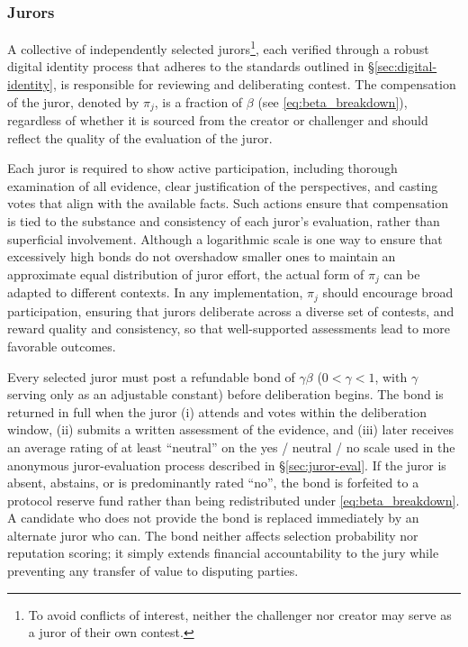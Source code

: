 \documentclass{article}
\begin{document}
\subsubsection{Jurors}

A collective of independently selected jurors\footnote{To avoid conflicts of interest, neither the challenger nor creator may serve as a juror of their own contest.}, each verified through a robust digital identity process that adheres to the standards outlined in \S\ref{sec:digital-identity}, is responsible for reviewing and deliberating contest. The compensation of the juror, denoted by $\pi_j$, is a fraction of $\beta$ (see \cref{eq:beta_breakdown}), regardless of whether it is sourced from  the creator or challenger and should reflect the quality of the evaluation of the juror. 

Each juror is required to show active participation, including thorough examination of all evidence, clear justification of the perspectives, and casting votes that align with the available facts. Such actions ensure that compensation is tied to the substance and consistency of each juror’s evaluation, rather than superficial involvement. Although a logarithmic scale is one way to ensure that excessively high bonds do not overshadow smaller ones to maintain an approximate equal distribution of juror effort, the actual form of $\pi_j$ can be adapted to different contexts. In any implementation, $\pi_j$ should encourage broad participation, ensuring that jurors deliberate across a diverse set of contests, and reward quality and consistency, so that well-supported assessments lead to more favorable outcomes.

Every selected juror must post a refundable bond of $\gamma\beta$ ($0 < \gamma < 1$, with $\gamma$ serving only as an adjustable constant) before deliberation begins. The bond is returned in full when the juror (i) attends and votes within the deliberation window, (ii) submits a written assessment of the evidence, and (iii) later receives an average rating of at least ``neutral'' on the yes / neutral / no scale used in the anonymous juror-evaluation process described in \S\ref{sec:juror-eval}. If the juror is absent, abstains, or is predominantly rated ``no'', the bond is forfeited to a protocol reserve fund rather than being redistributed under \cref{eq:beta_breakdown}. A candidate who does not provide the bond is replaced immediately by an alternate juror who can. The bond neither affects selection probability nor reputation scoring; it simply extends financial accountability to the jury while preventing any transfer of value to disputing parties.
\end{document}
